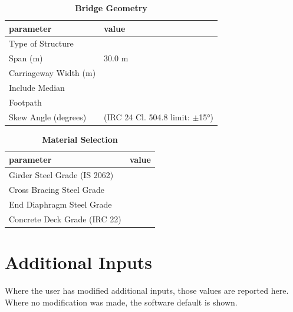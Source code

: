 \documentclass[12pt,a4paper]{report}
\numberwithin{table}{chapter}
\numberwithin{figure}{chapter}
\begin{document}
\begin{table}[H]
\caption{\textbf{Bridge Geometry}}
\label{subsec:bridge-geometry}
\begin{tabular}{|L{5.5cm}|L{8.5cm}|}
\hline
\textbf{parameter} & \textbf{value} \\
\hline
\textnormal{Type of Structure} &  \\
\hline
\textnormal{Span (m)} & 30.0 m \\
\hline
\textnormal{Carriageway Width (m)} &  \\
\hline
\textnormal{Include Median} &  \\
\hline
\textnormal{Footpath} &  \\
\hline
\textnormal{Skew Angle (degrees)} &  (IRC 24 Cl. 504.8 limit: $\pm$15°) \\
\hline
\end{tabular}
\end{table}
\vspace{0.4cm}

\begin{table}[H]
\caption{\textbf{Material Selection}}
\label{subsec:material}
\begin{tabular}{|L{5.5cm}|L{8.5cm}|}
\hline
\textbf{parameter} & \textbf{value} \\
\hline
\textnormal{Girder Steel Grade (IS 2062)} &  \\
\hline
\textnormal{Cross Bracing Steel Grade} &  \\
\hline
\textnormal{End Diaphragm Steel Grade} &  \\
\hline
\textnormal{Concrete Deck Grade (IRC 22)} &  \\
\hline
\end{tabular}
\end{table}
\vspace{0.4cm}

\newpage
\section{Additional Inputs}
\label{sec:additional-inputs}

Where the user has modified additional inputs, those values are reported here. Where no modification was made, the software default is shown.

\vspace{0.8cm}
\end{document}
